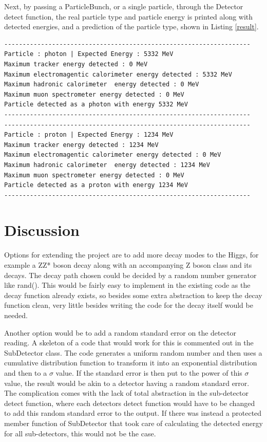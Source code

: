 \documentclass[11pt]{article} %
\begin{document}
Next, by passing a ParticleBunch, or a single particle,  through the Detector detect function, the real particle type and particle energy is printed along with detected energies, and a prediction of the particle type, shown in Listing \ref{result}.  
\begin{lstlisting}[caption={Expected output for Detector when a photon and a proton are passed through it, with the max energy from each sub-detector returned along with a prediction of this outcome based on the energy returned.}, label=result]
-------------------------------------------------------------------
Particle : photon | Expected Energy : 5332 MeV 
Maximum tracker energy detected : 0 MeV 
Maximum electromagentic calorimeter energy detected : 5332 MeV 
Maximum hadronic calorimeter  energy detected : 0 MeV 
Maximum muon spectrometer energy detected : 0 MeV 
Particle detected as a photon with energy 5332 MeV 
-------------------------------------------------------------------
-------------------------------------------------------------------
Particle : proton | Expected Energy : 1234 MeV 
Maximum tracker energy detected : 1234 MeV 
Maximum electromagentic calorimeter energy detected : 0 MeV 
Maximum hadronic calorimeter  energy detected : 1234 MeV 
Maximum muon spectrometer energy detected : 0 MeV 
Particle detected as a proton with energy 1234 MeV 
-------------------------------------------------------------------
\end{lstlisting}
\section{Discussion}
Options for extending the project are to add more decay modes to the Higgs, for example a ZZ* boson decay along with an accompanying Z boson class and its decays. The decay path chosen could be decided by a random number generator like rand(). This would be fairly easy to implement in the existing code as the decay function already exists, so besides some extra abstraction to keep the decay function clean, very little besides writing the code for the decay itself would be needed.

Another option would be to add a random standard error on the detector reading. A skeleton of a code that would work for this is commented out in the SubDetector class. The code generates a uniform random number and then uses a cumulative distribution function to transform it into an exponential distribution and then to a $\sigma$ value. If the standard error is then put to the power of this $\sigma$ value, the result would be akin to a detector having a random standard error. The complication comes with the lack of total abstraction in the sub-detector detect function, where each detectors detect function would have to be changed to add this random standard error to the output. If there was instead a protected member function of SubDetector that took care of calculating the detected energy for all sub-detectors, this would not be the case.
\newpage
\end{document}
